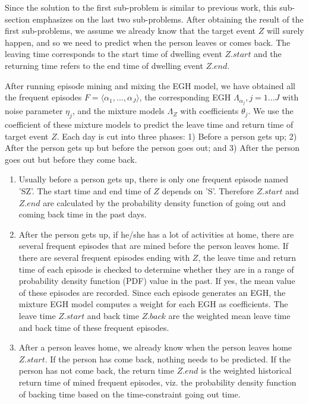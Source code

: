 Since the solution to the first sub-problem is similar to 
previous work, 
this sub-section emphasizes on the last two sub-problems. 
After obtaining the result of the first sub-problems, 
we assume we already know that the target event $Z$ will surely happen, 
and so we need to predict when the person leaves or comes back. 
The leaving time corresponds to the start time of dwelling event $Z.start$ and 
the returning time refers to the end time of dwelling event $Z.end$. 

After running episode mining and mixing the EGH model, 
we have obtained all the frequent episodes $F=\langle \alpha_1,..., \alpha_J \rangle$, 
the corresponding EGH $\Lambda_{\alpha_j}, j=1...J$ with noise parameter $\eta_j$, 
and the mixture models $\Lambda_Z$ with coefficients $\theta_j$.
We use the coefficient of these mixture models to predict the leave time and return time of 
target event $Z$. 
 Each day is cut into three phases: 1) Before a person gets up; 
2) After the person gets up but before the person goes out;
and 3) After the person goes out but before they come back. 
\begin{enumerate}
\item
Usually before a person gets up, there is only one frequent episode named 'SZ'. 
The start time and end time of $Z$ depends on 'S'. 
Therefore $Z.start$ and $Z.end$  are calculated by the probability density function of 
going out and coming back time in the past days. 
\item
After the person gets up, if he/she has a lot of activities at home, 
there are several frequent episodes that are mined before the person leaves home. 
If there are several frequent episodes ending with $Z$,  
the leave time and return time of each episode is checked to determine
whether they are in a range of probability density function (PDF) value in the past. 
If yes, the mean value of these episodes are recorded. 
Since each episode generates an EGH, 
the mixture EGH model computes a weight for each EGH as coefficients. 
The leave time $Z.start$ and back time $Z.back$ are 
the weighted mean leave time and back time of these frequent episodes. 
\item
After a person leaves home, 
we already know when the person leaves home $Z.start$. 
If the person has come back, 
nothing needs to be predicted. 
If the person has not come back,  
the return time $Z.end$ is the weighted 
 historical return time of mined 
frequent episodes, 
viz. the probability density function of backing time based on the 
time-constraint going out time.
\end{enumerate}

